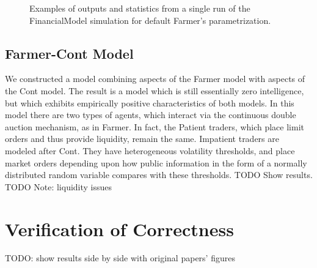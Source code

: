 \documentclass[runningheads]{llncs}
\begin{document}
\begin{figure}[htbp]
\begin{center}
{      }
    \caption{Examples of outputs and statistics from a single run of the FinancialModel simulation for default Farmer's parametrization.}
    \label{fig:sampleDynamicsFarmer}
  \end{center}
\end{figure}

\subsection{Farmer-Cont Model}
We constructed a model combining aspects of the Farmer model with aspects of the Cont model. The result is a model which is still essentially zero intelligence, but which exhibits empirically positive characteristics of both models. In this model there are two types of agents, which interact via the continuous double auction mechanism, as in Farmer. In fact, the Patient traders, which place limit orders and thus provide liquidity, remain the same. Impatient traders are modeled after Cont. They have heterogeneous volatility thresholds, and place market orders depending upon how public information in the form of a normally distributed random variable compares with these thresholds.
TODO Show results.
TODO Note: liquidity issues



\section{Verification of Correctness}
TODO: show results side by side with original papers' figures


\end{document}
